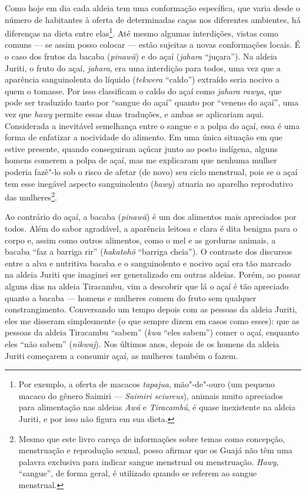 Como hoje em dia cada aldeia tem uma conformação específica, que varia
desde o número de habitantes à oferta de determinadas caças nos
diferentes ambientes, há diferenças na dieta entre elas\footnote{Por
  exemplo, a oferta de macacos \emph{tapajua}, mão"-de"-ouro (um pequeno
  macaco do gênero Saimiri --- \emph{Saimiri sciureus}), animais muito
  apreciados para alimentação nas aldeias \emph{Awá} e \emph{Tiracambú},
  é quase inexistente na aldeia Juriti, e por isso não figura em sua
  dieta.}. Até mesmo algumas interdições, vistas como comuns --- se assim
posso colocar --- estão sujeitas a novas conformações locais. É o caso dos
frutos da bacaba (\emph{pinawã}) e do açaí (\emph{jahara} ``juçara''). Na
aldeia Juriti, o fruto do açaí, \emph{jahara}, era uma interdição para
todos, uma vez que a aparência sanguinolenta do líquido (\emph{tekwera}
``caldo'') extraído seria nocivo a quem o tomasse. Por isso classificam o
caldo do açaí como \emph{jahara rawya}, que pode ser traduzido tanto por
``sangue do açaí'' quanto por ``veneno do açaí'', uma vez que \emph{hawy}
permite essas duas traduções, e ambas se aplicariam aqui. Considerada a
inevitável semelhança entre o sangue e a polpa do açaí, essa é uma forma
de enfatizar a nocividade do alimento. Em uma única situação em que
estive presente, quando conseguiram açúcar junto ao posto indígena,
alguns homens comerem a polpa de açaí, mas me explicaram que nenhuma
mulher poderia fazê"-lo sob o risco de afetar (de novo) seu ciclo
menstrual, pois se o açaí tem esse inegável aspecto sanguinolento
(\emph{hawy}) atuaria no aparelho reprodutivo das mulheres\footnote{Mesmo
  que este livro careça de informações sobre temas como concepção,
  menstruação e reprodução sexual, posso afirmar que os Guajá não têm
  uma palavra exclusiva para indicar sangue menstrual ou menstruação.
  \emph{Hawy}, ``sangue'', de forma geral, é utilizado quando se referem
  ao sangue menstrual.}.

Ao contrário do açaí, a bacaba (\emph{pinawã}) é um dos alimentos mais
apreciados por todos. Além do sabor agradável, a aparência leitosa e
clara é dita benigna para o corpo e, assim como outros alimentos, como o
mel e as gorduras animais, a bacaba ``faz a barriga rir'' (\emph{hakatohõ}
``barriga cheia''). O contraste dos discursos entre a alva e nutritiva
bacaba e o sanguinolento e nocivo açaí era tão marcado na aldeia Juriti
que imaginei ser generalizado em outras aldeias. Porém, ao passar alguns
dias na aldeia Tiracambu, vim a descobrir que lá o açaí é tão apreciado
quanto a bacaba --- homens e mulheres comem do fruto sem qualquer
constrangimento. Conversando um tempo depois com as pessoas da aldeia
Juriti, eles me disseram simplesmente (o que sempre dizem em casos como
esses): que as pessoas da aldeia Tiracambu ``sabem'' (\emph{kwa} ``eles
sabem'') comer o açaí, enquanto eles ``não sabem'' (\emph{nikwaj}). Nos
últimos anos, depois de os homens da aldeia Juriti começarem a consumir
açaí, as mulheres também o fazem.

